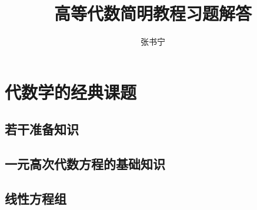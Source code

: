 \documentclass[a4paper, 11pt]{ctexbook}
\title{高等代数简明教程习题解答}
\author{张书宁}
\date{}
\begin{document}
    \maketitle
    \tableofcontents
    \chapter{代数学的经典课题}
        \section{若干准备知识}
        \section{一元高次代数方程的基础知识}
        \section{线性方程组}
\end{document}
